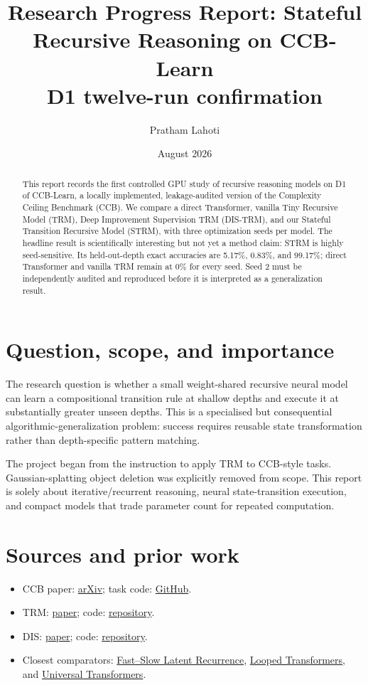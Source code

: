 \documentclass[11pt]{article}
\title{Research Progress Report: Stateful Recursive Reasoning on CCB-Learn\\\large D1 twelve-run confirmation}
\author{Pratham Lahoti}
\date{August 2026}
\begin{document}
\maketitle

\begin{abstract}
This report records the first controlled GPU study of recursive reasoning models
on D1 of CCB-Learn, a locally implemented, leakage-audited version of the
Complexity Ceiling Benchmark (CCB). We compare a direct Transformer, vanilla
Tiny Recursive Model (TRM), Deep Improvement Supervision TRM (DIS-TRM), and
our Stateful Transition Recursive Model (STRM), with three optimization seeds
per model. The headline result is scientifically interesting but not yet a
method claim: STRM is highly seed-sensitive. Its held-out-depth exact
accuracies are 5.17\%, 0.83\%, and 99.17\%; direct Transformer and vanilla
TRM remain at 0\% for every seed. Seed 2 must be independently audited and
reproduced before it is interpreted as a generalization result.
\end{abstract}

\section{Question, scope, and importance}
The research question is whether a small weight-shared recursive neural model
can learn a compositional transition rule at shallow depths and execute it at
substantially greater unseen depths. This is a specialised but consequential
algorithmic-generalization problem: success requires reusable state
transformation rather than depth-specific pattern matching.

The project began from the instruction to apply TRM to CCB-style tasks.
Gaussian-splatting object deletion was explicitly removed from scope. This
report is solely about iterative/recurrent reasoning, neural state-transition
execution, and compact models that trade parameter count for repeated
computation.

\section{Sources and prior work}
\begin{itemize}
\item CCB paper: \href{https://arxiv.org/abs/2606.29278}{arXiv}; task code:
\href{https://github.com/Shubh-Chapra/Complexity_Ceiling_Benchmark}{GitHub}.
\item TRM: \href{https://arxiv.org/abs/2510.04871}{paper}; code:
\href{https://github.com/SamsungSAILMontreal/TinyRecursiveModels}{repository}.
\item DIS: \href{https://arxiv.org/abs/2511.16886}{paper}; code:
\href{https://github.com/machinestein/Deep-Improvement-Supervision}{repository}.
\item Closest comparators: \href{https://arxiv.org/abs/2604.01577}{Fast--Slow
Latent Recurrence}, \href{https://arxiv.org/abs/2409.15647}{Looped
Transformers}, and \href{https://arxiv.org/abs/1807.03819}{Universal
Transformers}.
\end{itemize}
\end{document}
